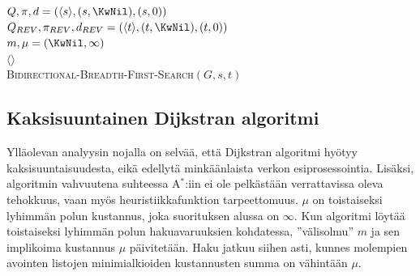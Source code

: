 \documentclass[finnish]{tktltiki2}
\newenvironment{finalgo}[1][htb]{
  \renewcommand{\algorithmcfname}{Algoritmi}
  \begin{algorithm}[#1]
}{\end{algorithm}}
\theoremstyle{definition}
\theoremstyle{remark}
\begin{document}
\begin{finalgo}[p]
  $Q, \pi, d = (\langle s \rangle, (s, \KwNil), (s, 0))$ \\
  $Q_{REV}, \pi_{REV}, d_{REV} = (\langle t \rangle, (t, \KwNil), (t, 0))$ \\
  $m, \mu = (\KwNil, \infty)$ \\
  \KwRet $\langle \rangle$ \\
\caption{\textsc{Bidirectional-Breadth-First-Search}$(G, s, t)$}
\end{finalgo}

\subsection{Kaksisuuntainen Dijkstran algoritmi}
Ylläolevan analyysin nojalla on selvää, että Dijkstran algoritmi hyötyy kaksisuuntaisuudesta, eikä edellytä minkäänlaista verkon esiprosessointia. Lisäksi, algoritmin vahvuutena suhteessa A$^{\ast}$:iin ei ole pelkästään verrattavissa oleva tehokkuus, vaan myös heuristiikkafunktion tarpeettomuus. $\mu$ on toistaiseksi lyhimmän polun kustannus, joka suorituksen alussa on $\infty$. Kun algoritmi löytää toistaiseksi lyhimmän polun hakuavaruuksien kohdatessa, ''välisolmu'' $m$ ja sen implikoima kustannus $\mu$ päivitetään. Haku jatkuu siihen asti, kunnes molempien avointen listojen minimialkioiden kustannusten summa on vähintään $\mu$. 
\end{document}
